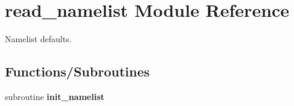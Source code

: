 \hypertarget{namespaceread__namelist}{
\section{read\_\-namelist Module Reference}
\label{namespaceread__namelist}
}
Namelist defaults.  


\subsection*{Functions/Subroutines}
\begin{CompactItemize}
\item 
\hypertarget{namespaceread__namelist_1dca9017a80a97235e743599d27454ae}{
subroutine \textbf{init\_\-namelist}}
\label{namespaceread__namelist_1dca9017a80a97235e743599d27454ae}

\end{CompactItemize}
